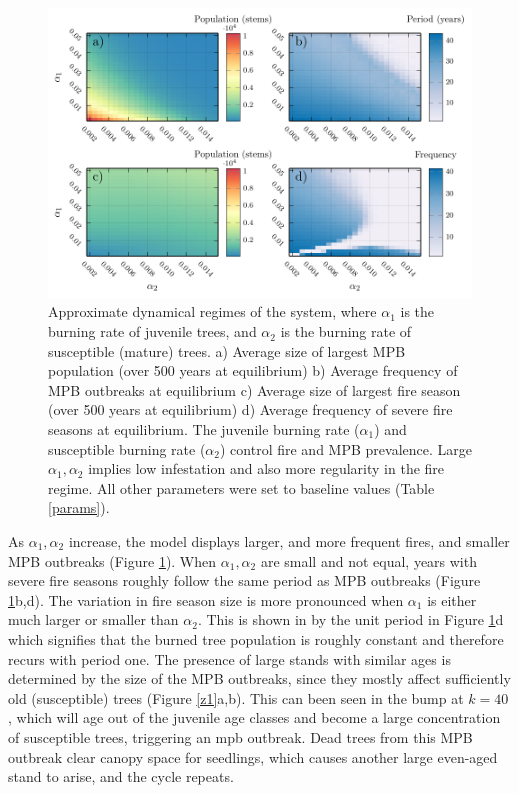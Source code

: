 \begin{figure}
  \includegraphics[width=\textwidth]{chapter_3/a1_a2_phase.pdf}
\caption{Approximate dynamical regimes of the system, where $\alpha_1$ is the burning rate of juvenile trees, and $\alpha_2$ is the burning rate of susceptible (mature) trees. a) Average size of largest MPB population (over 500 years at equilibrium) b) Average frequency of MPB outbreaks at equilibrium c) Average size of largest fire season (over 500 years at equilibrium) d) Average frequency of severe fire seasons at equilibrium. The juvenile burning rate ($\alpha_1$) and susceptible burning rate ($\alpha_2$) control fire and MPB prevalence. Large $\alpha_1,\alpha_2$ implies low infestation and also more regularity in the fire regime. All other parameters were set to baseline values (Table \ref{params}).}  
\label{dynamical_regimes}
\end{figure}


    As $\alpha_1, \alpha_2$ increase, the model displays larger, and more frequent fires, and smaller MPB outbreaks (Figure \ref{dynamical_regimes}). When $\alpha_1, \alpha_2$ are small and not equal, years with severe fire seasons roughly follow the same period as MPB outbreaks  (Figure \ref{dynamical_regimes}b,d). The variation in fire season size is more pronounced when $\alpha_1$ is either much larger or smaller than $\alpha_2$. This is shown in by the unit period in Figure \ref{dynamical_regimes}d which signifies that the burned tree population is roughly constant and therefore recurs with period one. The presence of large stands with similar ages is determined by the size of the MPB outbreaks, since they mostly affect sufficiently old (susceptible) trees (Figure \ref{z1}a,b). This can been seen in the bump at $k  = 40$, which will age out of the juvenile age classes and become a large concentration of susceptible trees, triggering an mpb outbreak. Dead trees from this MPB outbreak clear canopy space for seedlings, which causes another large even-aged stand to arise, and the cycle repeats.

